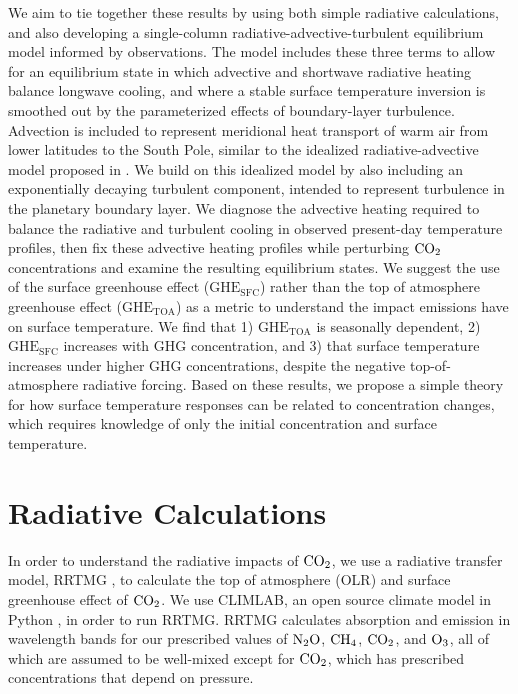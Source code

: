 \documentclass[draft]{agujournal2019}
\begin{document}
We aim to tie together these results by using both simple radiative calculations, and also developing a single-column radiative-advective-turbulent equilibrium model informed by observations. The model includes these three terms to allow for an equilibrium state in which advective and shortwave radiative heating balance longwave cooling, and where a stable surface temperature inversion is smoothed out by the parameterized effects of boundary-layer turbulence. Advection is included to represent meridional heat transport of warm air from lower latitudes to the South Pole, similar to the idealized radiative-advective model proposed in . We build on this idealized model by also including an exponentially decaying turbulent component, intended to represent turbulence in the planetary boundary layer. We diagnose the advective heating required to balance the radiative and turbulent cooling in observed present-day temperature profiles, then fix these advective heating profiles while perturbing $\ce{CO_2}$ concentrations and examine the resulting equilibrium states. We suggest the use of the surface greenhouse effect ($\text{GHE}_\text{{SFC}}$) rather than the top of atmosphere greenhouse effect ($\text{GHE}_\text{{TOA}}$) as a metric to understand the impact  emissions have on surface temperature. We find that 1) $\text{GHE}_\text{{TOA}}$ is seasonally dependent, 2) $\text{GHE}_{\text{SFC}}$ increases with GHG concentration, and 3) that surface temperature increases under higher GHG concentrations, despite the negative top-of-atmosphere radiative forcing. Based on these results, we propose a simple theory for how surface temperature responses can be related to  concentration changes, which requires knowledge of only the initial  concentration and surface temperature.

\section{Radiative Calculations}

In order to understand the radiative impacts of $\ce{CO_2}$, we use a radiative transfer model, RRTMG \cite{mlawer_radiative_1997}, to calculate the top of atmosphere (OLR) and surface greenhouse effect of $\ce{CO_2}$. We use CLIMLAB, an open source climate model in Python \cite{rose_climlab_2018}, in order to run RRTMG. RRTMG calculates absorption and emission in wavelength bands for our prescribed values of $\ce{N_2O}$, $\ce{CH_4}$, $\ce{CO_2}$, and $\ce{O_3}$, all of which are assumed to be well-mixed except for $\ce{CO_2}$, which has prescribed concentrations that depend on pressure. 
\end{document}
